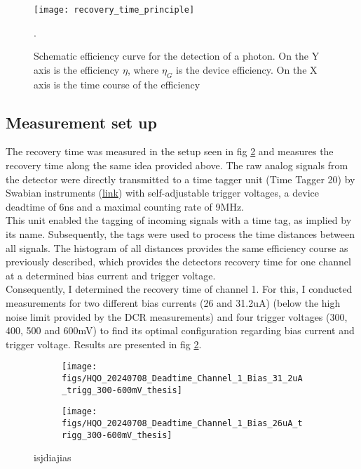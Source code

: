 \begin{figure}[H]
 \centering
 \texttt{[image: recovery\_time\_principle]}
 \caption{Schematic efficiency curve for the detection of a photon\cite{shalm_single-photon_2013}. On the Y axis is the
 efficiency $\eta$, where $\eta_{G}$ is the device efficiency. On the X axis is the time course of the efficiency}.
 \label{fig:Recovery_time}
\end{figure}

\subsection*{Measurement set up}

The recovery time was measured in the setup seen in fig \ref{fig: recovery_time_measurement_31_2_and_26uA} and measures the recovery time
along the same idea provided above.
The raw analog signals from the detector were directly transmitted to a time tagger unit (Time Tagger 20)
by Swabian instruments (\href{https://www.swabianinstruments.com/time-tagger/}{link})
with self-adjustable trigger voltages, a device deadtime of 6ns and a maximal counting rate of 9MHz.\\

This unit enabled the tagging of incoming signals with a time tag, as implied by its name.
Subsequently, the tags were used to process the time distances between all signals.
The histogram of all distances provides the same efficiency course as previously described,
which provides the detectors recovery time for one channel at a determined bias current and trigger voltage.\\

Consequently, I determined the recovery time of channel 1.
For this, I conducted measurements for two different bias currents (26 and 31.2uA)
(below the high noise limit provided by the DCR measurements) and four trigger voltages (300, 400, 500 and 600mV) to find
its optimal configuration regarding bias current and trigger voltage.
Results are presented in fig \ref{fig: recovery_time_measurement_31_2_and_26uA}.

\begin{figure}[H]
  \begin{subfigure}[t]{.45\textwidth}
    \centering
    \texttt{[image: figs/HQO\_20240708\_Deadtime\_Channel\_1\_Bias\_31\_2uA\_trigg\_300-600mV\_thesis]}
  \end{subfigure}
  \hfill
  \begin{subfigure}[t]{.45\textwidth}
    \centering
    \texttt{[image: figs/HQO\_20240708\_Deadtime\_Channel\_1\_Bias\_26uA\_trigg\_300-600mV\_thesis]}
  \end{subfigure}
  \label{fig: recovery_time_measurement_31_2_and_26uA}
  \caption{isjdiajias}
\end{figure}


